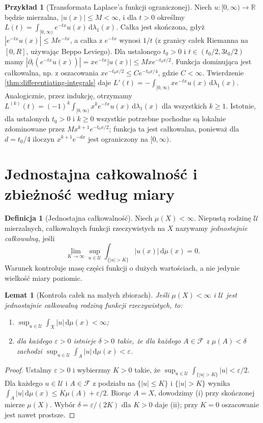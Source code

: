 \documentclass[11pt,a4paper,oneside]{book}
\numberwithin{equation}{chapter}
\theoremstyle{plain}
\newtheorem{lemat}[twierdzenie]{Lemat}
\theoremstyle{definition}
\newtheorem{definicja}[twierdzenie]{Definicja}
\newtheorem{przyklad}[twierdzenie]{Przykład}
\theoremstyle{remark}
\begin{document}
\begin{przyklad}[Transformata Laplace'a funkcji ograniczonej]
Niech $u:[0,\infty)\to\mathbb R$ będzie mierzalna,
$|u(x)|\le M<\infty$, i dla $t>0$ określmy
$L(t)=\int_{[0,\infty)}e^{-tx}u(x)\,\mathrm d\lambda_1(x)$.
Całka jest skończona, gdyż $|e^{-tx}u(x)|\le Me^{-tx}$,
a całka z $e^{-tx}$ wynosi $1/t$ (z granicy
całek Riemanna na $[0,R]$, używając Beppo Leviego).
Dla ustalonego $t_0>0$ i $t\in(t_0/2,3t_0/2)$
mamy
$|\partial_t(e^{-tx}u(x))|=xe^{-tx}|u(x)|
\le Mxe^{-t_0x/2}$.
Funkcja dominująca jest całkowalna, np. z oszacowania
$x e^{-t_0x/2}\le C e^{-t_0x/4}$, gdzie $C<\infty$.
Twierdzenie \ref{thm:differentiating-integrals} daje
$L'(t)=-\int_{[0,\infty)}xe^{-tx}u(x)\,\mathrm d\lambda_1(x)$.
Analogicznie, przez indukcję, otrzymamy
$L^{(k)}(t)=(-1)^k\int_{[0,\infty)}x^ke^{-tx}u(x)
\,\mathrm d\lambda_1(x)$ dla wszystkich $k\ge1$.
Istotnie, dla ustalonych $t_0>0$ i $k\ge0$
wszystkie potrzebne pochodne są lokalnie
zdominowane przez $Mx^{k+1}e^{-t_0x/2}$;
funkcja ta jest całkowalna, ponieważ dla
$d=t_0/4$ iloczyn $x^{k+1}e^{-dx}$ jest
ograniczony na $[0,\infty)$.
\end{przyklad}

\section{Jednostajna całkowalność i zbieżność według miary}

\begin{definicja}[Jednostajna całkowalność]
\label{def:uniform-integrability}
Niech $\mu(X)<\infty$. Niepustą rodzinę $\mathcal U$
mierzalnych, całkowalnych funkcji rzeczywistych
na $X$ nazywamy \emph{jednostajnie całkowalną},
jeśli
\[
\lim_{K\to\infty}\sup_{u\in\mathcal U}
\int_{\{|u|>K\}}|u(x)|\,\mathrm d\mu(x)=0.
\]
Warunek kontroluje masę części funkcji o dużych
wartościach, a nie jedynie wielkość miary poziomic.
\end{definicja}

\begin{lemat}[Kontrola całek na małych zbiorach]
\label{lem:uniform-absolute-continuity}
Jeśli $\mu(X)<\infty$ i $\mathcal U$ jest jednostajnie
całkowalną rodziną funkcji rzeczywistych, to:
\begin{enumerate}[label=\textup{(\roman*)}]
\item $\sup_{u\in\mathcal U}\int_X|u|\,\mathrm d\mu(x)<\infty$;
\item dla każdego $\varepsilon>0$ istnieje $\delta>0$
takie, że dla każdego $A\in\mathcal F$ z
$\mu(A)<\delta$ zachodzi
$\sup_{u\in\mathcal U}\int_A|u|\,\mathrm d\mu(x)<\varepsilon$.
\end{enumerate}
\end{lemat}
\begin{proof}
Ustalmy $\varepsilon>0$ i wybierzmy $K>0$ takie, że
$\sup_{u\in\mathcal U}\int_{\{|u|>K\}}|u|<\varepsilon/2$.
Dla każdego $u\in\mathcal U$ i $A\in\mathcal F$
z podziału na $\{|u|\le K\}$ i $\{|u|>K\}$
wynika
$\int_A|u|\,\mathrm d\mu(x)\le K\mu(A)+\varepsilon/2$.
Biorąc $A=X$, dowodzimy (i) przy skończonej
mierze $\mu(X)$. Wybór
$\delta=\varepsilon/(2K)$ dla $K>0$ daje (ii);
przy $K=0$ oszacowanie jest nawet prostsze.
\end{proof}
\end{document}
